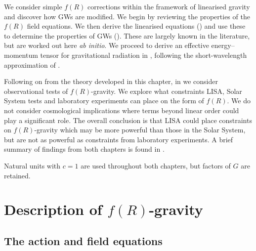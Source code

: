 We consider simple $f(R)$ corrections within the framework of linearised gravity and discover how GWs are modified. We begin by reviewing the properties of the $f(R)$ field equations. We then derive the linearised equations () and use these to determine the properties of GWs (). These are largely known in the literature, but are worked out here {\it ab initio}. We proceed to derive an effective energy--momentum tensor for gravitational radiation in , following the short-wavelength approximation of \citet{Isaacson1968, Isaacson1968a}.

Following on from the theory developed in this chapter, in  we consider observational tests of $f(R)$-gravity. We explore what constraints LISA, Solar System tests and laboratory experiments can place on the form of $f(R)$. We do not consider cosmological implications where terms beyond linear order could play a significant role. The overall conclusion is that LISA could place constraints on $f(R)$-gravity which may be more powerful than those in the Solar System, but are not as powerful as constraints from laboratory experiments. A brief summary of findings from both chapters is found in .

Natural units with $c = 1$ are used throughout both chapters, but factors of $G$ are retained.

\section{Description of $f(R)$-gravity}

\subsection{The action and field equations}\label{sec:Action}

